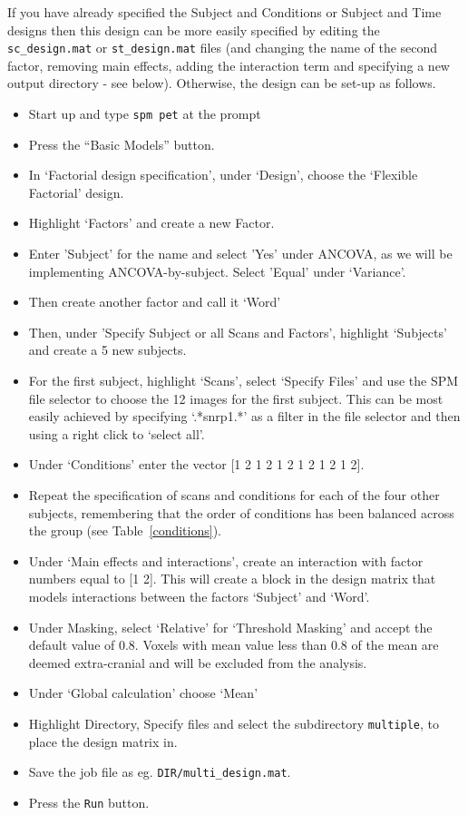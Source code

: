 If you have already specified the Subject and Conditions or Subject and Time designs then this design can be more easily specified by editing the \texttt{sc\_design.mat} or \texttt{st\_design.mat} files (and changing the name of the second factor, removing main effects, adding the interaction term and specifying a new output directory - see below). Otherwise, the design can be set-up as follows.
\begin{itemize}
\item{Start up \matlab and type \texttt{spm pet} at the prompt}
\item{Press the ``Basic Models'' button.}
\item{In `Factorial design specification', under `Design', choose the `Flexible Factorial' design.}
\item{Highlight `Factors' and create a new Factor.}
\item{Enter 'Subject' for the name and select 'Yes' under ANCOVA, as we will be implementing ANCOVA-by-subject. Select 'Equal' under `Variance'.}
\item{Then create another factor and call it `Word'}
\item{Then, under 'Specify Subject or all Scans and Factors', highlight `Subjects' and create a 5 new subjects.}
\item{For the first subject, highlight `Scans', select `Specify Files' and use the SPM file selector to choose the 12 images for the first subject. This can be most easily achieved by specifying `.*snrp1.*' as a filter in the file selector and then using a right click to `select all'.}
\item{Under `Conditions' enter the vector [1 2 1 2 1 2 1 2 1 2 1 2].}
\item{Repeat the specification of scans and conditions for each of the four other subjects, remembering that the order of conditions has been balanced across the group (see Table~\ref{conditions}).}
\item{Under `Main effects and interactions', create an interaction with factor numbers equal to [1 2]. This will create a block in the design matrix that models interactions between the factors `Subject' and `Word'.}
\item{Under Masking, select `Relative' for `Threshold Masking' and accept the default value of 0.8. Voxels with mean value less than 0.8 of the mean are deemed extra-cranial and will be excluded from the analysis.}
\item{Under `Global calculation' choose `Mean'}
\item{Highlight Directory, Specify files and select the subdirectory \texttt{multiple}, to place the design matrix in.}
\item{Save the job file as eg. \texttt{DIR/multi\_design.mat}}.
\item{Press the \texttt{Run} button.}
\end{itemize}
